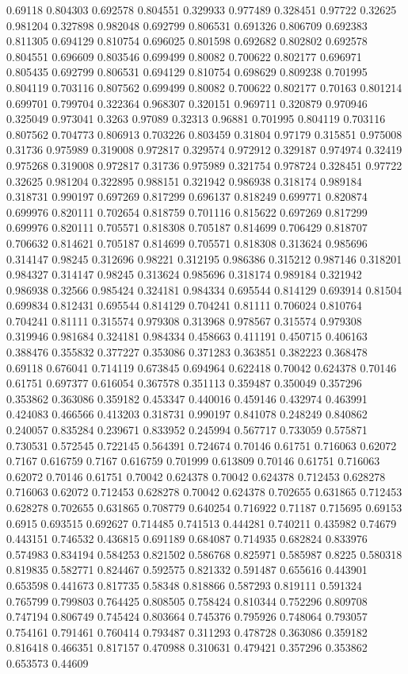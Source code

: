 0.69118 0.804303
0.692578 0.804551
0.329933 0.977489
0.328451 0.97722
0.32625 0.981204
0.327898 0.982048
0.692799 0.806531
0.691326 0.806709
0.692383 0.811305
0.694129 0.810754
0.696025 0.801598
0.692682 0.802802
0.692578 0.804551
0.696609 0.803546
0.699499 0.80082
0.700622 0.802177
0.696971 0.805435
0.692799 0.806531
0.694129 0.810754
0.698629 0.809238
0.701995 0.804119
0.703116 0.807562
0.699499 0.80082
0.700622 0.802177
0.70163 0.801214
0.699701 0.799704
0.322364 0.968307
0.320151 0.969711
0.320879 0.970946
0.325049 0.973041
0.3263 0.97089
0.32313 0.96881
0.701995 0.804119
0.703116 0.807562
0.704773 0.806913
0.703226 0.803459
0.31804 0.97179
0.315851 0.975008
0.31736 0.975989
0.319008 0.972817
0.329574 0.972912
0.329187 0.974974
0.32419 0.975268
0.319008 0.972817
0.31736 0.975989
0.321754 0.978724
0.328451 0.97722
0.32625 0.981204
0.322895 0.988151
0.321942 0.986938
0.318174 0.989184
0.318731 0.990197
0.697269 0.817299
0.696137 0.818249
0.699771 0.820874
0.699976 0.820111
0.702654 0.818759
0.701116 0.815622
0.697269 0.817299
0.699976 0.820111
0.705571 0.818308
0.705187 0.814699
0.706429 0.818707
0.706632 0.814621
0.705187 0.814699
0.705571 0.818308
0.313624 0.985696
0.314147 0.98245
0.312696 0.98221
0.312195 0.986386
0.315212 0.987146
0.318201 0.984327
0.314147 0.98245
0.313624 0.985696
0.318174 0.989184
0.321942 0.986938
0.32566 0.985424
0.324181 0.984334
0.695544 0.814129
0.693914 0.81504
0.699834 0.812431
0.695544 0.814129
0.704241 0.81111
0.706024 0.810764
0.704241 0.81111
0.315574 0.979308
0.313968 0.978567
0.315574 0.979308
0.319946 0.981684
0.324181 0.984334
0.458663 0.411191
0.450715 0.406163
0.388476 0.355832
0.377227 0.353086
0.371283 0.363851
0.382223 0.368478
0.69118 0.676041
0.714119 0.673845
0.694964 0.622418
0.70042 0.624378
0.70146 0.61751
0.697377 0.616054
0.367578 0.351113
0.359487 0.350049
0.357296 0.353862
0.363086 0.359182
0.453347 0.440016
0.459146 0.432974
0.463991 0.424083
0.466566 0.413203
0.318731 0.990197
0.841078 0.248249
0.840862 0.240057
0.835284 0.239671
0.833952 0.245994
0.567717 0.733059
0.575871 0.730531
0.572545 0.722145
0.564391 0.724674
0.70146 0.61751
0.716063 0.62072
0.7167 0.616759
0.7167 0.616759
0.701999 0.613809
0.70146 0.61751
0.716063 0.62072
0.70146 0.61751
0.70042 0.624378
0.70042 0.624378
0.712453 0.628278
0.716063 0.62072
0.712453 0.628278
0.70042 0.624378
0.702655 0.631865
0.712453 0.628278
0.702655 0.631865
0.708779 0.640254
0.716922 0.71187
0.715695 0.69153
0.6915 0.693515
0.692627 0.714485
0.741513 0.444281
0.740211 0.435982
0.74679 0.443151
0.746532 0.436815
0.691189 0.684087
0.714935 0.682824
0.833976 0.574983
0.834194 0.584253
0.821502 0.586768
0.825971 0.585987
0.8225 0.580318
0.819835 0.582771
0.824467 0.592575
0.821332 0.591487
0.655616 0.443901
0.653598 0.441673
0.817735 0.58348
0.818866 0.587293
0.819111 0.591324
0.765799 0.799803
0.764425 0.808505
0.758424 0.810344
0.752296 0.809708
0.747194 0.806749
0.745424 0.803664
0.745376 0.795926
0.748064 0.793057
0.754161 0.791461
0.760414 0.793487
0.311293 0.478728
0.363086 0.359182
0.816418 0.466351
0.817157 0.470988
0.310631 0.479421
0.357296 0.353862
0.653573 0.44609
